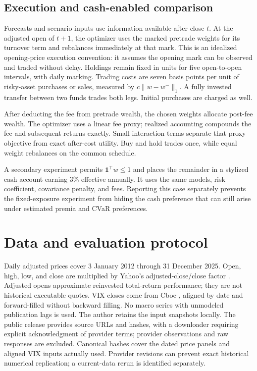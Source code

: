 \subsection{Execution and cash-enabled comparison}
Forecasts and scenario inputs use information available after close $t$. At the adjusted open of $t+1$, the optimizer uses the marked pretrade weights for its turnover term and rebalances immediately at that mark. This is an idealized opening-price execution convention: it assumes the opening mark can be observed and traded without delay. Holdings remain fixed in units for five open-to-open intervals, with daily marking. Trading costs are seven basis points per unit of risky-asset purchases or sales, measured by $c\lVert w-w^-\rVert_1$. A fully invested transfer between two funds trades both legs. Initial purchases are charged as well.

After deducting the fee from pretrade wealth, the chosen weights allocate post-fee wealth. The optimizer uses a linear fee proxy; realized accounting compounds the fee and subsequent returns exactly. Small interaction terms separate that proxy objective from exact after-cost utility. Buy and hold trades once, while equal weight rebalances on the common schedule.

A secondary experiment permits $\boldsymbol1^\top w\leq1$ and places the remainder in a stylized cash account earning 3\% effective annually. It uses the same models, risk coefficient, covariance penalty, and fees. Reporting this case separately prevents the fixed-exposure experiment from hiding the cash preference that can still arise under estimated premia and CVaR preferences.

\section{Data and evaluation protocol}
Daily adjusted prices cover 3 January 2012 through 31 December 2025. Open, high, low, and close are multiplied by Yahoo's adjusted-close/close factor \cite{yahoo}. Adjusted opens approximate reinvested total-return performance; they are not historical executable quotes. VIX closes come from Cboe \cite{cboe}, aligned by date and forward-filled without backward filling. No macro series with unmodeled publication lags is used. The author retains the input snapshots locally. The public release provides source URLs and hashes, with a downloader requiring explicit acknowledgment of provider terms; provider observations and raw responses are excluded. Canonical hashes cover the dated price panels and aligned VIX inputs actually used. Provider revisions can prevent exact historical numerical replication; a current-data rerun is identified separately.


